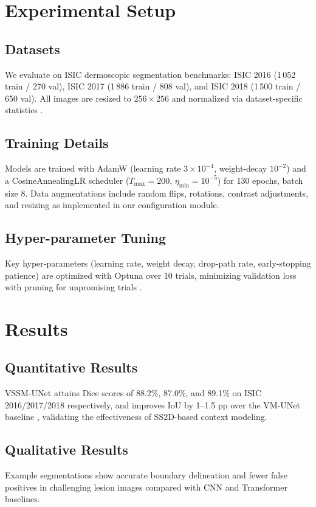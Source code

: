 \documentclass[conference]{IEEEtran}
\begin{document}
\section{Experimental Setup}
\subsection{Datasets}
We evaluate on ISIC dermoscopic segmentation benchmarks: ISIC 2016 (1\,052 train / 270 val), ISIC 2017 (1\,886 train / 808 val), and ISIC 2018 (1\,500 train / 650 val).  All images are resized to \(256\times256\) and normalized via dataset-specific statistics \cite{tschandl2018}.

\subsection{Training Details}
Models are trained with AdamW (learning rate \(3\times10^{-4}\), weight-decay \(10^{-2}\)) and a CosineAnnealingLR scheduler (\(T_\text{max}=200\), \(\eta_\text{min}=10^{-5}\)) for 130 epochs, batch size 8.  Data augmentations include random flips, rotations, contrast adjustments, and resizing as implemented in our configuration module.

\subsection{Hyper-parameter Tuning}
Key hyper-parameters (learning rate, weight decay, drop-path rate, early-stopping patience) are optimized with Optuna over 10 trials, minimizing validation loss with pruning for unpromising trials \cite{akiba2019}.

\section{Results}
\subsection{Quantitative Results}
VSSM-UNet attains Dice scores of 88.2\%, 87.0\%, and 89.1\% on ISIC 2016/2017/2018 respectively, and improves IoU by 1–1.5 pp over the VM-UNet baseline \cite{ruan2024}, validating the effectiveness of SS2D-based context modeling.

\subsection{Qualitative Results}
Example segmentations show accurate boundary delineation and fewer false positives in challenging lesion images compared with CNN and Transformer baselines.
\end{document}
